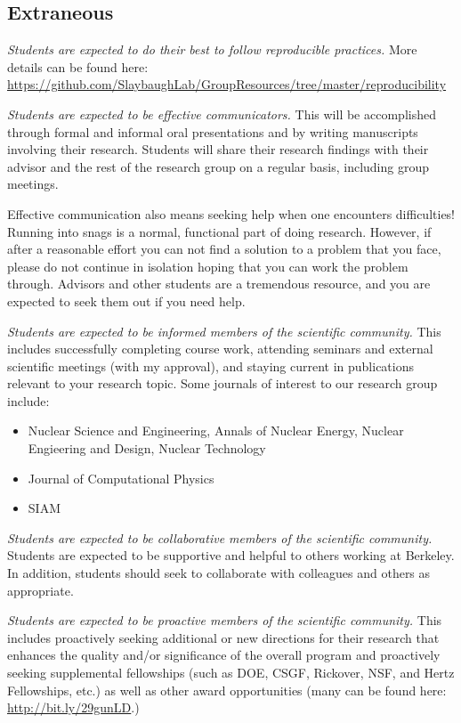 \documentclass[12pt,twoside]{article}
\begin{document}
\subsection*{Extraneous}

\textit{Students are expected to do their best to follow reproducible practices.} More details can be found here: \href{https://github.com/SlaybaughLab/GroupResources/tree/master/reproducibility}{https://github.com/SlaybaughLab/GroupResources/tree/master/reproducibility}

\textit{Students are expected to be effective communicators.} This will be accomplished through formal and informal oral presentations and by writing manuscripts involving their research. Students will share their research findings with their advisor and the rest of the research group on a regular basis, including group meetings.  

Effective communication also means seeking help when one encounters difficulties! Running into snags is a normal, functional part of doing research. However, if after a reasonable effort you can not find a solution to a problem that you face, please do not continue in isolation hoping that you can work the problem through. Advisors and other students are a tremendous resource, and you are expected to seek them out if you need help.

\textit{Students are expected to be informed members of the scientific community.} This includes successfully completing course work, attending seminars and external scientific meetings (with my approval), and staying current in publications relevant to your research topic. Some journals of interest to our research group include: 
%
\begin{itemize}
\item Nuclear Science and Engineering, Annals of Nuclear Energy, Nuclear Engieering and Design, Nuclear Technology
\item Journal of Computational Physics
\item SIAM 
\end{itemize}

\textit{Students are expected to be collaborative members of the scientific community.} Students are expected to be supportive and helpful to others working at Berkeley. In addition, students should seek to collaborate with colleagues and others as appropriate.

\textit{Students are expected to be proactive members of the scientific community.} This includes proactively seeking additional or new directions for their research that enhances the quality and/or significance of the overall program and proactively seeking supplemental fellowships (such as DOE, CSGF, Rickover, NSF, and Hertz Fellowships, etc.) as well as other award opportunities (many can be found here: \href{http://bit.ly/29gunLD}{http://bit.ly/29gunLD}.)
\end{document}
